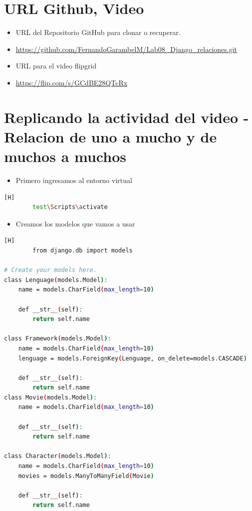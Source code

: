 \documentclass{article}
\begin{document}
\section{URL Github, Video}
	\begin{itemize}
		\item URL del Repositorio GitHub para clonar o recuperar.
		\item \url{https://github.com/FernandoGarambelM/Lab08_Django_relaciones.git}
		\item URL para el video flipgrid
		\item \url{https://flip.com/s/GCdBE28QTcRx}	
	\end{itemize}
	\clearpage
\section{Replicando la actividad del video - Relacion de uno a mucho y de muchos a muchos}
	\begin{itemize}
		\item Primero ingresamos al entorno virtual
	\end{itemize}
	\begin{lstlisting}[language=bash,caption={Activar el ambiente virtual}][H]
		test\Scripts\activate
	\end{lstlisting}
	\begin{itemize}
		\item Creamos los modelos que vamos a usar
	\end{itemize}
	\begin{lstlisting}[language=bash,caption={Codigo de models.py}][H]
		from django.db import models

# Create your models here.
class Lenguage(models.Model):
    name = models.CharField(max_length=10)
    
    def __str__(self):
        return self.name
    
class Framework(models.Model):
    name = models.CharField(max_length=10)
    lenguage = models.ForeignKey(Lenguage, on_delete=models.CASCADE)

    def __str__(self):
        return self.name
class Movie(models.Model):
    name = models.CharField(max_length=10)

    def __str__(self):
        return self.name
    
class Character(models.Model):
    name = models.CharField(max_length=10)
    movies = models.ManyToManyField(Movie)

    def __str__(self):
        return self.name
	\end{lstlisting}
\end{document}
